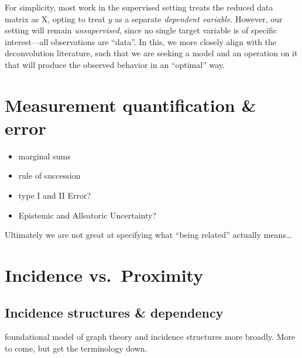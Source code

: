 \documentclass[%
	12pt,
		oneside,
		letterpaper
]{book}
\providecommand{\tightlist}{%
  \setlength{\itemsep}{0pt}\setlength{\parskip}{0pt}}\usepackage{longtable,booktabs,array}
\begin{document}
For simplicity, most work in the supervised setting treats the reduced
data matrix as X, opting to treat \(y\) as a separate \emph{dependent
variable}. However, our setting will remain \emph{unsupervised}, since
no single target variable is of specific interest---all observations are
``data''. In this, we more closely align with the deconvolution
literature, such that we are seeking a model and an operation on it that
will produce the observed behavior in an ``optimal'' way.

\section{Measurement quantification \&
error}\label{measurement-quantification-error}

\begin{itemize}
\tightlist
\item
  marginal sums
\item
  rule of succession
\item
  type I and II Error?
\item
  Epistemic and Alleatoric Uncertainty?
\end{itemize}

Ultimately we are not great at specifying what ``being related''
actually means\ldots{}

\section{Incidence vs.~Proximity}\label{incidence-vs.-proximity}

\subsection{Incidence structures \&
dependency}\label{incidence-structures-dependency}

foundational model of graph theory and incidence structures more
broadly. More to come, but get the terminology down.
\end{document}

